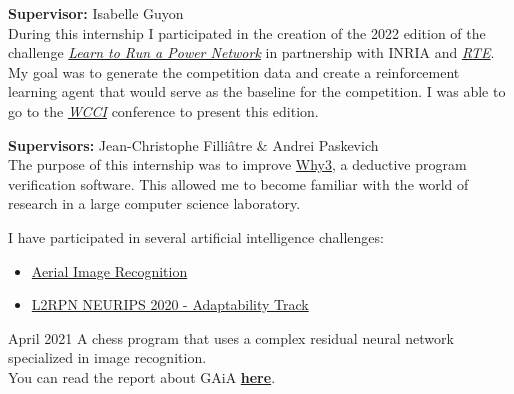 \documentclass[10pt,a4paper,ragged2e,withhyper]{altacv}
\begin{document}
\begin{paracol}{2}

        
        \textbf{Supervisor:} Isabelle Guyon\\
        \vspace{3pt}
        During this internship I participated in the creation of the 2022 edition of the challenge
        \href{https://l2rpn.chalearn.org/}{\textit{Learn to Run a Power Network}} in partnership with INRIA and
        \href{https://www.rte-france.com/}{\textit{RTE}}.
        My goal was to generate the competition data and create a reinforcement learning agent
        that would serve as the baseline for the competition. I was able to go to the
        \href{https://wcci2022.org/}{\textit{WCCI}} conference to present this edition.

        \divider

        \textbf{Supervisors:} Jean-Christophe Filliâtre \& Andrei Paskevich\\
        \vspace{3pt}
        The purpose of this internship was to improve \href{http://why3.lri.fr/}{Why3}, a deductive program verification software.
        This allowed me to become familiar with the world of research in a large computer science laboratory.

        \pagebreak

          I have participated in several artificial intelligence challenges:
          \begin{itemize}
            \item \href{https://codalab.lisn.upsaclay.fr/competitions/573}{Aerial Image Recognition}
            \item \href{https://competitions.codalab.org/competitions/25427}{L2RPN NEURIPS 2020 - Adaptability Track}
          \end{itemize}

            {April 2021}{}
            A chess program that uses a complex residual neural network specialized in image recognition.\\
            You can read the report about GAiA
            \href{https://raw.githubusercontent.com/gaetanserre/GAiA/master/report/Performing%20Regression%20on%20Complex%20Data.pdf}
            {\textbf{here}}.\\
            \vspace{4pt}
            \\
            \vspace{4pt}
            \divider


\end{paracol}
\end{document}
